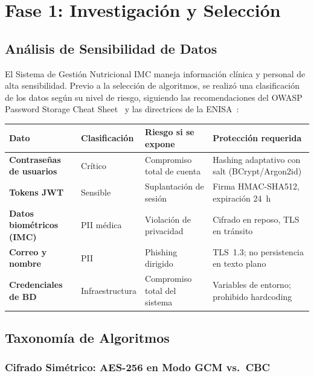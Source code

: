 \section*{Fase 1: Investigación y Selección}

\subsection*{Análisis de Sensibilidad de Datos}

El Sistema de Gestión Nutricional IMC maneja información clínica y personal de alta sensibilidad.
Previo a la selección de algoritmos, se realizó una clasificación de los datos según su nivel de
riesgo, siguiendo las recomendaciones del OWASP Password Storage Cheat Sheet~\cite{owasp2023} y
las directrices de la ENISA~\cite{enisa2021}:

\begin{center}
\begin{tabular}{>{\bfseries}p{3.8cm} p{2.2cm} p{3cm} p{4.5cm}}
\toprule
\textbf{Dato} & \textbf{Clasificación} & \textbf{Riesgo si se expone} & \textbf{Protección requerida} \\
\midrule
Contraseñas de usuarios  & Crítico        & Compromiso total de cuenta      & Hashing adaptativo con salt (BCrypt/Argon2id) \\
Tokens JWT               & Sensible       & Suplantación de sesión          & Firma HMAC-SHA512, expiración 24~h \\
Datos biométricos (IMC)  & PII médica     & Violación de privacidad         & Cifrado en reposo, TLS en tránsito \\
Correo y nombre          & PII            & Phishing dirigido               & TLS~1.3; no persistencia en texto plano \\
Credenciales de BD       & Infraestructura & Compromiso total del sistema   & Variables de entorno; prohibido hardcoding \\
\bottomrule
\end{tabular}
\end{center}

\subsection*{Taxonomía de Algoritmos}

\subsubsection*{Cifrado Simétrico: AES-256 en Modo GCM vs.\ CBC}

